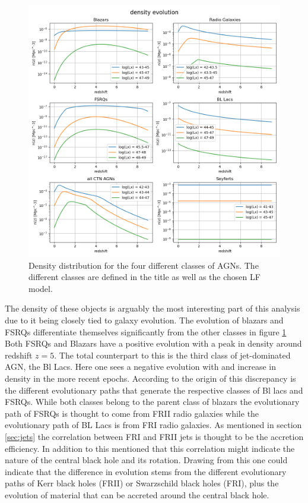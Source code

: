 \documentclass{article}
\begin{document}
\begin{figure}[H]
    \centering
    \includegraphics[width = \textwidth]{new_plots/Redshift density evolution.png}
    \caption{Density distribution for the four different classes of AGNs. The different classes are defined in the title as well as the chosen LF model.}
    \label{fig:DD}
\end{figure}



The density of these objects is arguably the most interesting part of this analysis due to it being closely tied to galaxy evolution. The evolution of blazars and FSRQs differentiate themselves significantly from the other classes in figure \ref*{fig:DD}
Both FSRQs and Blazars have a positive evolution with a peak in density around redshift $z=5$. The total counterpart to this is the third class of jet-dominated AGN, the Bl Lacs. Here one sees a negative evolution with 
and increase in density in the more recent epochs. According to \cite{Garofalo_2019} the origin of this discrepancy is the different evolutionary paths that generate the respective classes of Bl lacs and FSRQs. 
While both classes belong to the parent class of blazars the evolutionary path of FSRQs is thought to come from FRII radio galaxies while the evolutionary path of BL Lacs is from FRI radio galaxies. As mentioned in section \ref*{sec:jets} the correlation between FRI and FRII jets is thought to be the accretion efficiency. 
In addition to this \cite{Wei-Hao_2003} mentioned that this correlation might indicate the nature of the central black hole and its rotation. Drawing from this one could indicate that the difference in evolution stems from the different evolutionary paths of Kerr black holes (FRII) or Swarzschild black holes (FRI), plus the evolution of material that can be accreted around the central black hole.
\end{document}
